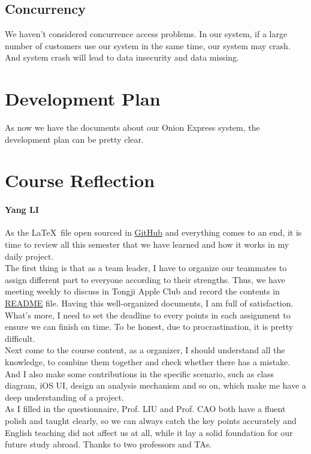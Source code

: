 \documentclass[12pt]{scrreprt}
\begin{document}
\section{Concurrency}
We haven't considered concurrence access problems. In our system, if a large number of customers use our system in the same time, our system may  crash.  And system crash will lead to data insecurity and data missing.
\chapter{Development Plan}
As now we have the documents about our Onion Express system, the development plan can be pretty clear.

\chapter{Course Reflection}
\subsubsection{Yang LI}
As the \LaTeX\ file open sourced in \href{https://github.com/zjzsliyang/OnionExpress}{GitHub} and everything comes to an end, it is time to review all this semester that we have learned and how it works in my daily project.\\
The first thing is that as a team leader, I have to organize our teammates to assign different part to everyone according to their strengths. Thus, we have meeting weekly to discuss in Tongji Apple Club and record the contents in \href{https://github.com/zjzsliyang/OnionExpress/blob/master/README.md}{README} file. Having this well-organized documents, I am full of satisfaction. What's more, I need to set the deadline to every points in each assignment to ensure we can finish on time. To be honest, due to procrastination, it is pretty difficult.\\
Next come to the course content, as a organizer, I should understand all the knowledge, to combine them together and check whether there has a mistake. And I also make some contributions in the specific scenario, such as class diagram, iOS UI, design an analysis mechanism and so on, which make me have a deep understanding of a project.\\
As I filled in the questionnaire, Prof. LIU and Prof. CAO both have a fluent polish and taught clearly, so we can always catch the key points accurately and English teaching did not affect us at all, while it lay a solid foundation for our future study abroad. Thanks to two professors and TAs.
\end{document}
